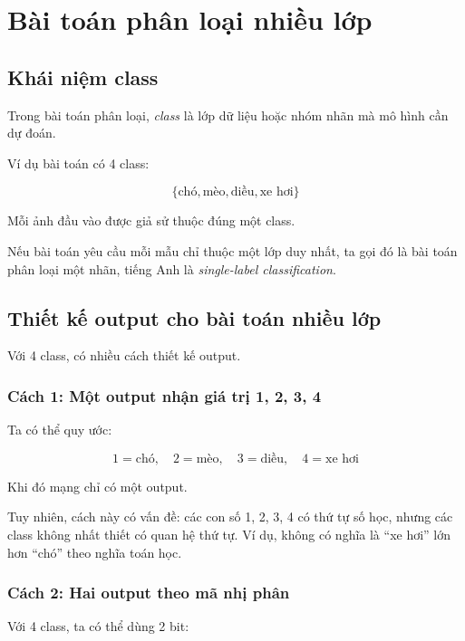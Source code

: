 \documentclass[12pt,a4paper]{report}
\begin{document}
\chapter{Bài toán phân loại nhiều lớp}

\section{Khái niệm class}

Trong bài toán phân loại, \textit{class} là lớp dữ liệu hoặc nhóm nhãn mà mô hình cần dự đoán.

Ví dụ bài toán có 4 class:

\[
    \{\text{chó}, \text{mèo}, \text{diều}, \text{xe hơi}\}
\]

Mỗi ảnh đầu vào được giả sử thuộc đúng một class.

\begin{ghinho}
Nếu bài toán yêu cầu mỗi mẫu chỉ thuộc một lớp duy nhất, ta gọi đó là bài toán phân loại một nhãn, tiếng Anh là \textit{single-label classification}.
\end{ghinho}

\section{Thiết kế output cho bài toán nhiều lớp}

Với 4 class, có nhiều cách thiết kế output.

\subsection{Cách 1: Một output nhận giá trị 1, 2, 3, 4}

Ta có thể quy ước:

\[
    1 = \text{chó}, \quad
    2 = \text{mèo}, \quad
    3 = \text{diều}, \quad
    4 = \text{xe hơi}
\]

Khi đó mạng chỉ có một output.

Tuy nhiên, cách này có vấn đề: các con số 1, 2, 3, 4 có thứ tự số học, nhưng các class không nhất thiết có quan hệ thứ tự. Ví dụ, không có nghĩa là ``xe hơi'' lớn hơn ``chó'' theo nghĩa toán học.

\subsection{Cách 2: Hai output theo mã nhị phân}

Với 4 class, ta có thể dùng 2 bit:
\end{document}

